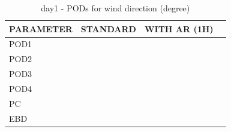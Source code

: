 \begin{table}[p!]
\begin{center}
\begin{tabular}{|l|l|l|l|}
\hline
\multicolumn{1}{|c|}{\cellcolor[HTML]{C0C0C0}\textbf{PARAMETER}} & \multicolumn{1}{c|}{\cellcolor[HTML]{C0C0C0}\textbf{STANDARD}} & \multicolumn{1}{c|}{\cellcolor[HTML]{C0C0C0}\textbf{WITH AR (1H)}} \\
\hline
\cellcolor[HTML]{C0C0C0}POD1  &       &      \\
\cellcolor[HTML]{C0C0C0}POD2  &       &      \\
\cellcolor[HTML]{C0C0C0}POD3  &       &      \\
\cellcolor[HTML]{C0C0C0}POD4  &       &      \\
\cellcolor[HTML]{C0C0C0}PC    &         &        \\
\cellcolor[HTML]{C0C0C0}EBD   &        &       \\
\hline
\end{tabular}
\caption{day1 - PODs for wind direction (degree)}
\label{tab:podwd:day1}
\end{center}
\end{table}
